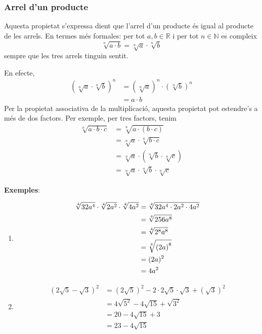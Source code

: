 \subsubsection{Arrel d’un producte}

Aquesta propietat s’expressa dient que l’arrel d’un producte és igual
al producte de les arrels. En termes més formales: per tot $%
a,b\in \mathbb{R}$ i per tot $n\in \mathbb{N}$ es compleix%
\begin{equation*}
\sqrt[n]{a\cdot b}=\sqrt[n]{a}\cdot \sqrt[n]{b}
\end{equation*}%
sempre que les tres arrels tinguin sentit.

En efecte,%
\begin{align*}
\left( \sqrt[n]{a}\cdot \sqrt[n]{b}\right) ^{n} &=\left( \sqrt[n]{a}\right)
^{n}\cdot \left( \sqrt[n]{b}\right) ^{n} \\
&=a\cdot b
\end{align*}%
Per la propietat associativa de la multiplicació, aquesta propietat pot
estendre’s a més de dos factors. Per exemple, per tres factors,
tenim%
\begin{align*}
\sqrt[n]{a\cdot b\cdot c} &=\sqrt[n]{a\cdot \left( b\cdot c\right) } \\
&=\sqrt[n]{a}\cdot \sqrt[n]{b\cdot c} \\
&=\sqrt[n]{a}\cdot \left( \sqrt[n]{b}\cdot \sqrt[n]{c}\right) \\
&=\sqrt[n]{a}\cdot \sqrt[n]{b}\cdot \sqrt[n]{c}
\end{align*}

\textbf{Exemples}:

\begin{enumerate}
\item 
\begin{align*}
\sqrt[4]{32a^{4}}\cdot \sqrt[4]{2a^{2}}\cdot \sqrt[4]{4a^{2}} &=\sqrt[4]{%
32a^{4}\cdot 2a^{2}\cdot 4a^{2}} \\
&=\sqrt[4]{256a^{8}} \\
&=\sqrt[4]{2^{8}a^{8}} \\
&=\sqrt[4]{\left( 2a\right) ^{8}} \\
&=(2a)^{2} \\
&=4a^{2}
\end{align*}

\item 
\begin{align*}
\left( 2\sqrt{5}-\sqrt{3}\right) ^{2} &=\left( 2\sqrt{5}\right) ^{2}-2\cdot
2\sqrt{5}\cdot \sqrt{3}+\left( \sqrt{3}\right) ^{2} \\
&=4\sqrt{5^{2}}-4\sqrt{15}+\sqrt{3^{2}} \\
&=20-4\sqrt{15}+3 \\
&=23-4\sqrt{15}
\end{align*}
\end{enumerate}

